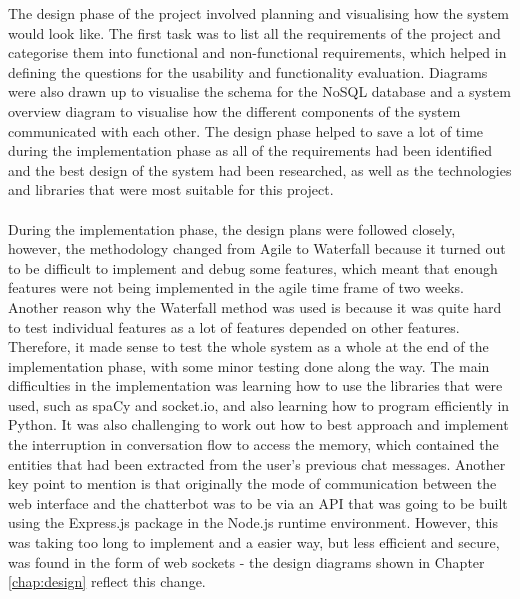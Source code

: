 The design phase of the project involved planning and visualising how the system would look like. The first task was to list all the requirements of the project and categorise them into functional and non-functional requirements, which helped in defining the questions for the usability and functionality evaluation. Diagrams were also drawn up to visualise the schema for the NoSQL database and a system overview diagram to visualise how the different components of the system communicated with each other. The design phase helped to save a lot of time during the implementation phase as all of the requirements had been identified and the best design of the system had been researched, as well as the technologies and libraries that were most suitable for this project.\\\\
During the implementation phase, the design plans were followed closely, however, the methodology changed from Agile to Waterfall because it turned out to be difficult to implement and debug some features, which meant that enough features were not being implemented in the agile time frame of two weeks. Another reason why the Waterfall method was used is because it was quite hard to test individual features as a lot of features depended on other features. Therefore, it made sense to test the whole system as a whole at the end of the implementation phase, with some minor testing done along the way. The main difficulties in the implementation was learning how to use the libraries that were used, such as spaCy and socket.io, and also learning how to program efficiently in Python. It was also challenging to work out how to best approach and implement the interruption in conversation flow to access the memory, which contained the entities that had been extracted from the user's previous chat messages. Another key point to mention is that originally the mode of communication between the web interface and the chatterbot was to be via an API that was going to be built using the Express.js package in the Node.js runtime environment. However, this was taking too long to implement and a easier way, but less efficient and secure, was found in the form of web sockets - the design diagrams shown in Chapter \ref{chap:design} reflect this change.\\\\
